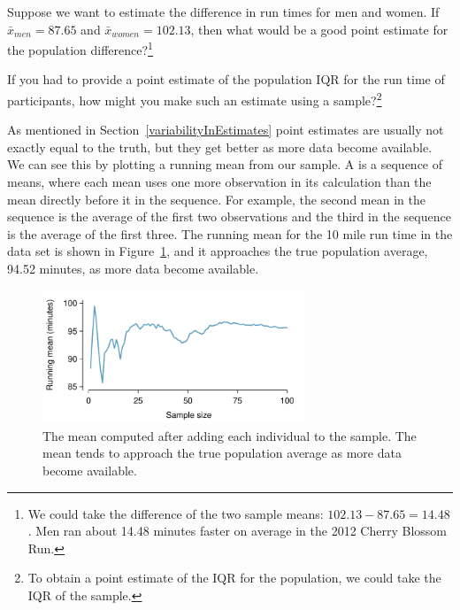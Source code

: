 \begin{exercise} \label{pointEstimateOfDifferentNetTimesBetweenGender}
Suppose we want to estimate the difference in run times for men and women. If $\bar{x}_{men} = 87.65$ and $\bar{x}_{women} = 102.13$, then what would be a good point estimate for the population difference?\footnote{We could take the difference of the two sample means: $102.13 - 87.65 = 14.48$. Men ran about 14.48 minutes faster on average in the 2012 Cherry Blossom Run.}
\end{exercise}

\begin{exercise}
If you had to provide a point estimate of the population IQR for the run time of participants, how might you make such an estimate using a sample?\footnote{To obtain a point estimate of the IQR for the population, we could take the IQR of the sample.}


\end{exercise}


As mentioned in Section~\ref{variabilityInEstimates}
point estimates are usually not exactly equal to the truth, but they get better as more data become available. We can see this by plotting a running mean from our  sample. A  is a sequence of means, where each mean uses one more observation in its calculation than the mean directly before it in the sequence. For example, the second mean in the sequence is the average of the first two observations and the third in the sequence is the average of the first three. The running mean for the 10 mile run time in the  data set is shown in Figure~\ref{netTimeRunningMean}, and it approaches the true population average, 94.52 minutes, as more data become available.

\begin{figure}[H]
   \centering
   \includegraphics[width=0.7\textwidth]{04-5/figures/netTimeRunningMean/netTimeRunningMean}
   \caption{The mean computed after adding each individual to the sample. The mean tends to approach the true population average as more data become available.}
   \label{netTimeRunningMean}
\end{figure}

